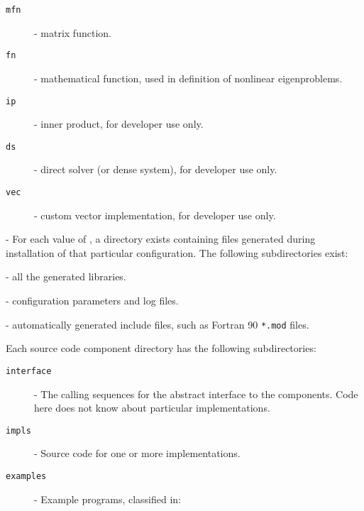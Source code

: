 \begin{description}
\begin{description}
\item[\texttt{mfn}] - matrix function.
\item[\texttt{fn}] - mathematical function, used in definition of nonlinear eigenproblems.
\item[\texttt{ip}] - inner product, for developer use only.
\item[\texttt{ds}] - direct solver (or dense system), for developer use only.
\item[\texttt{vec}] - custom vector implementation, for developer use only.
\end{description}
\item[\texttt{\$PETSC\_ARCH}] - For each value of , a directory exists containing files generated during installation of that particular configuration. The following subdirectories exist:
\begin{description}
\setlength{\itemsep}{0mm}
\item[\texttt{lib}] - all the generated libraries.
\item[\texttt{conf}] - configuration parameters and log files.
\item[\texttt{include}] - automatically generated include files, such as Fortran 90 \texttt{*.mod} files.
\end{description}
\end{description}

Each \slepc source code component directory has the following subdirectories:
\begin{description}
\item[\texttt{interface}] - The calling sequences for the abstract interface to the components. Code here does not know about particular implementations.
\item[\texttt{impls}] - Source code for one or more implementations.
\item[\texttt{examples}] - Example programs, classified in:
\end{description}


